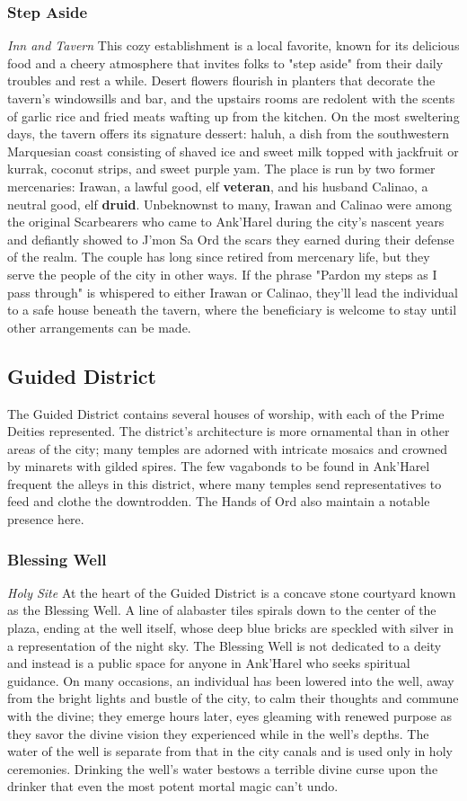 \documentclass[10pt,a4,twoside,twocolumn,openany,nodeprecatedcode]{dndbook}
\begin{document}
\subsubsection{Step Aside}
\textit{Inn and Tavern}
This cozy establishment is a local favorite, known for its delicious food and a cheery atmosphere that invites folks to "step aside" from their daily troubles and rest a while. Desert flowers flourish in planters that decorate the tavern's windowsills and bar, and the upstairs rooms are redolent with the scents of garlic rice and fried meats wafting up from the kitchen. On the most sweltering days, the tavern offers its signature dessert: haluh, a dish from the southwestern Marquesian coast consisting of shaved ice and sweet milk topped with jackfruit or kurrak, coconut strips, and sweet purple yam.
The place is run by two former mercenaries: Irawan, a lawful good, elf \textbf{veteran}, and his husband Calinao, a neutral good, elf \textbf{druid}. Unbeknownst to many, Irawan and Calinao were among the original Scarbearers who came to Ank'Harel during the city's nascent years and defiantly showed to J'mon Sa Ord the scars they earned during their defense of the realm. The couple has long since retired from mercenary life, but they serve the people of the city in other ways. If the phrase "Pardon my steps as I pass through" is whispered to either Irawan or Calinao, they'll lead the individual to a safe house beneath the tavern, where the beneficiary is welcome to stay until other arrangements can be made.
\subsection{Guided District}
The Guided District contains several houses of worship, with each of the Prime Deities represented. The district's architecture is more ornamental than in other areas of the city; many temples are adorned with intricate mosaics and crowned by minarets with gilded spires.
The few vagabonds to be found in Ank'Harel frequent the alleys in this district, where many temples send representatives to feed and clothe the downtrodden. The Hands of Ord also maintain a notable presence here.
\subsubsection{Blessing Well}
\textit{Holy Site}
At the heart of the Guided District is a concave stone courtyard known as the Blessing Well. A line of alabaster tiles spirals down to the center of the plaza, ending at the well itself, whose deep blue bricks are speckled with silver in a representation of the night sky.
The Blessing Well is not dedicated to a deity and instead is a public space for anyone in Ank'Harel who seeks spiritual guidance. On many occasions, an individual has been lowered into the well, away from the bright lights and bustle of the city, to calm their thoughts and commune with the divine; they emerge hours later, eyes gleaming with renewed purpose as they savor the divine vision they experienced while in the well's depths.
The water of the well is separate from that in the city canals and is used only in holy ceremonies. Drinking the well's water bestows a terrible divine curse upon the drinker that even the most potent mortal magic can't undo.
\end{document}
